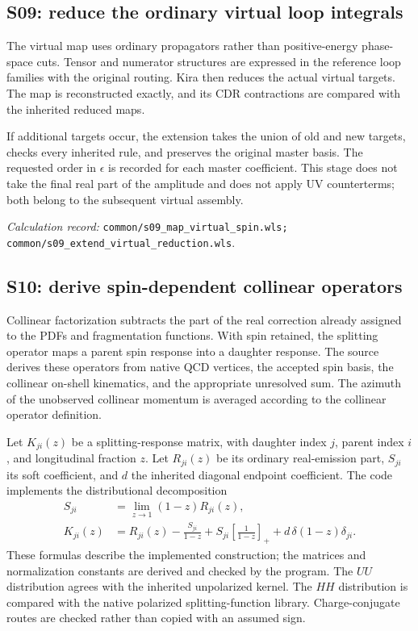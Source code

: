 \documentclass[11pt,a4paper]{article}
\newcommand{\eps}{\epsilon}
\newcommand{\code}[1]{{\small\nolinkurl{#1}}}
\newcommand{\pathref}[1]{\par{\footnotesize\textit{Calculation record:} \code{#1}.}\par}
\begin{document}
\subsection{S09: reduce the ordinary virtual loop integrals}
The virtual map uses ordinary propagators rather than positive-energy phase-space cuts. Tensor and numerator structures are expressed in the reference loop families with the original routing. Kira then reduces the actual virtual targets. The map is reconstructed exactly, and its CDR contractions are compared with the inherited reduced maps.

If additional targets occur, the extension takes the union of old and new targets, checks every inherited rule, and preserves the original master basis. The requested order in $\eps$ is recorded for each master coefficient. This stage does not take the final real part of the amplitude and does not apply UV counterterms; both belong to the subsequent virtual assembly.
\pathref{common/s09_map_virtual_spin.wls; common/s09_extend_virtual_reduction.wls}

\subsection{S10: derive spin-dependent collinear operators}
Collinear factorization subtracts the part of the real correction already assigned to the PDFs and fragmentation functions. With spin retained, the splitting operator maps a parent spin response into a daughter response. The source derives these operators from native QCD vertices, the accepted spin basis, the collinear on-shell kinematics, and the appropriate unresolved sum. The azimuth of the unobserved collinear momentum is averaged according to the collinear operator definition.

Let $K_{ji}(z)$ be a splitting-response matrix, with daughter index $j$, parent index $i$, and longitudinal fraction $z$. Let $R_{ji}(z)$ be its ordinary real-emission part, $S_{ji}$ its soft coefficient, and $d$ the inherited diagonal endpoint coefficient. The code implements the distributional decomposition
\begin{align}
 S_{ji}&=\lim_{z\to1}(1-z)R_{ji}(z),\\
 K_{ji}(z)&=R_{ji}(z)-\frac{S_{ji}}{1-z}
       +S_{ji}\left[\frac{1}{1-z}\right]_+
       +d\,\delta(1-z)\delta_{ji}.
\end{align}
These formulas describe the implemented construction; the matrices and normalization constants are derived and checked by the program. The $UU$ distribution agrees with the inherited unpolarized kernel. The $HH$ distribution is compared with the native polarized splitting-function library. Charge-conjugate routes are checked rather than copied with an assumed sign.
\end{document}

